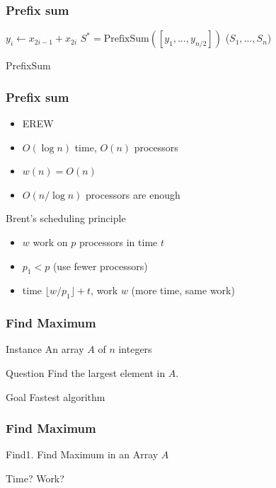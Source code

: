 \documentclass[12pt,aspectratio=169]{beamer}
\begin{document}
\begin{frame}\frametitle{Prefix sum}
\begin{algorithm}[H]
{
  $y_{i}\gets x_{2i-1} + x_{2i}$\;
}
$S^{*} = \text{PrefixSum}([y_{1}, \ldots , y_{n/2}])$\;
{
}
\Return($S_{1}, \ldots , S_{n}$)
\caption{PrefixSum}
\end{algorithm}
\end{frame}


\begin{frame}\frametitle{Prefix sum}
  \begin{itemize}
  \item
    EREW
  \item
    $O(\log n)$ time, $O(n)$ processors
  \item
    $w(n) = O(n)$
  \item
    $O(n/\log n)$ processors are enough
  \end{itemize}

\begin{block}{Brent's scheduling principle}
  \begin{itemize}
  \item
    $w$ work on $p$ processors in time $t$
  \item
    $p_{1}<p$ (use fewer processors)
  \item
    time $\lfloor w/p_{1}\rfloor +t$, work $w$ (more time, same work)
  \end{itemize}
\end{block}
\end{frame}

\begin{frame}\frametitle{Find Maximum}
\begin{block}{Instance}
An array $A$ of $n$ integers
\end{block}
\begin{block}{Question}
Find the largest element in $A$.    
\end{block}
\begin{block}{Goal}
Fastest algorithm
\end{block}
\end{frame}

\begin{frame}\frametitle{Find Maximum}
\begin{algorithm}[H]
\caption{Find1.    
Find Maximum in an Array $A$}
\end{algorithm}
Time? Work? 
\end{frame}
\end{document}
